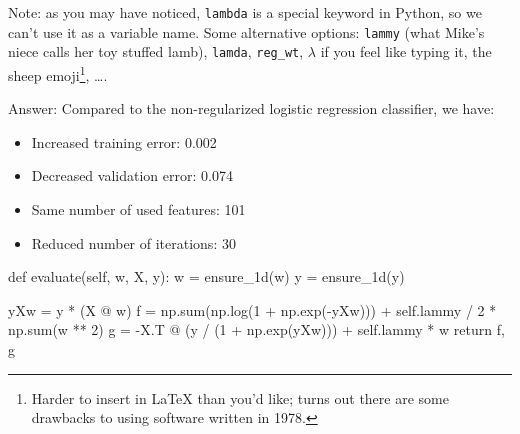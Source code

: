 \documentclass{article}
\newenvironment{answer}{\par\begingroup\color{gre}Answer: }{\endgroup}
\begin{document}
Note: as you may have noticed, \verb|lambda| is a special keyword in Python, so we can't use it as a variable name.
Some alternative options:
\verb|lammy| (what Mike's niece calls her toy stuffed lamb),
\verb|lamda|,
\verb|reg_wt|,
$\lambda$ if you feel like typing it,
the sheep emoji\footnote{Harder to insert in \LaTeX{} than you'd like; turns out there are some drawbacks to using software written in 1978.},
\dots.

\begin{answer}
    Compared to the non-regularized logistic regression classifier, we have:
    \begin{itemize}
        \item Increased training error: 0.002
        \item Decreased validation error: 0.074
        \item Same number of used features: 101
        \item Reduced number of iterations: 30
    \end{itemize}
\end{answer}
\begin{python}
def evaluate(self, w, X, y):
    w = ensure_1d(w)
    y = ensure_1d(y)

    yXw = y * (X @ w)
    f = np.sum(np.log(1 + np.exp(-yXw))) + self.lammy / 2 * np.sum(w ** 2)
    g = -X.T @ (y / (1 + np.exp(yXw))) + self.lammy * w
    return f, g
\end{python}
\end{document}
